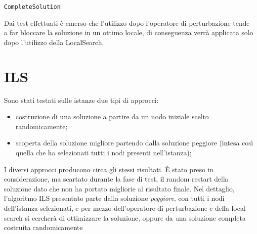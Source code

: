 \documentclass[11pt]{article}
\begin{document}
\begin{algorithm}
    \caption{\texttt{CompleteSolution}}
    \begin{algorithmic}
        
    
        
        \Else{}
        
        \EndIf{}
    \end{algorithmic}
    \end{algorithm}

Dai test effettuati è emerso che l'utilizzo dopo l'operatore di perturbazione tende a far bloccare la soluzione in un ottimo locale, di conseguenza verrà applicata solo dopo l'utilizzo della LocalSearch.

\section{ILS}

Sono stati testati sulle istanze due tipi di approcci:

\begin{itemize}
\item{costruzione di una soluzione a partire da un nodo iniziale scelto randomicamente;}
\item {scoperta della soluzione migliore partendo dalla soluzione peggiore (intesa così quella che ha selezionati tutti i nodi presenti nell'istanza);}
\end{itemize}

I diversi approcci producono circa gli stessi risultati. È stato preso in considerazione, ma scartato durante la fase di test, il random restart della soluzione dato che non ha portato migliorie al risultato finale.
Nel dettaglio, l'algoritmo ILS presentato parte dalla soluzione \textit{peggiore}, con tutti i nodi dell'istanza selezionati, e per mezzo dell'operatore di perturbazione e della local search si cercherà di ottimizzare la soluzione, oppure da una soluzione completa costruita
randomicamente 
\end{document}
